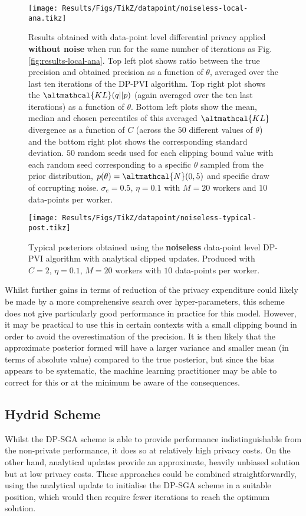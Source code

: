 \begin{figure}
	\texttt{[image: Results/Figs/TikZ/datapoint/noiseless-local-ana.tikz]}
	\centering
	\caption{\label{fig:results-noiseless-local-ana} Results obtained with data-point level differential privacy applied \textbf{without noise} when run for the same number of iterations as Fig. \ref{fig:results-local-ana}. Top left plot shows ratio between the true precision and obtained precision as a function of $\theta$, averaged over the last ten iterations of the DP-PVI algorithm. Top right plot shows the $\altmathcal{KL}(q||p)$ (again averaged over the ten last iterations) as a function of $\theta$. Bottom left plots show the mean, median and chosen percentiles of this averaged $\altmathcal{KL}$ divergence as a function of $C$ (across the $50$ different values of $\theta$) and the bottom right plot shows the corresponding standard deviation. $50$ random seeds used for each clipping bound value with each random seed corresponding to a specific $\theta$ sampled from the prior distribution, $p(\theta) = \altmathcal{N}(0, 5)$ and specific draw of corrupting noise. $\sigma_e = 0.5$, $\eta=0.1$ with $M=20$ workers and $10$ data-points per worker. }
\end{figure}

\begin{figure}
	\texttt{[image: Results/Figs/TikZ/datapoint/noiseless-typical-post.tikz]}
	\centering
	\caption{\label{fig:results-noiseless-typical-post} Typical posteriors obtained using the \textbf{noiseless} data-point level DP-PVI algorithm with analytical clipped updates. Produced with $C=2$, $\eta=0.1$, $M=20$ workers with $10$ data-points per worker.}
\end{figure}

Whilst further gains in terms of reduction of the privacy expenditure could likely be made by a more comprehensive search over hyper-parameters, this scheme does not give particularly good performance in practice for this model. However, it may be practical to use this in certain contexts with a small clipping bound in order to avoid the overestimation of the precision. It is then likely that the approximate posterior formed will have a larger variance and smaller mean (in terms of absolute value) compared to the true posterior, but since the bias appears to be systematic, the machine learning practitioner may be able to correct for this or at the minimum be aware of the consequences. 

\subsection{Hydrid Scheme}
Whilst the DP-SGA scheme is able to provide performance indistinguishable from the non-private performance, it does so at relatively high privacy costs. On the other hand, analytical updates provide an approximate, heavily unbiased solution but at low privacy costs. These approaches could be combined straightforwardly, using the analytical update to initialise the DP-SGA scheme in a suitable position, which would then require fewer iterations to reach the optimum solution. 

